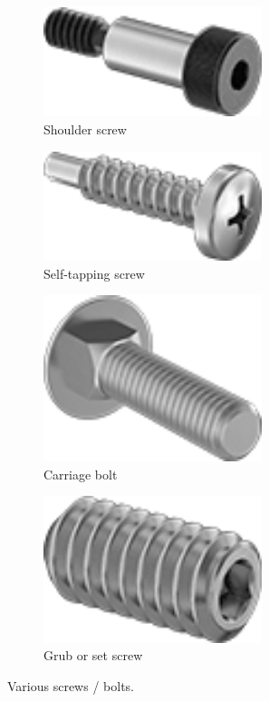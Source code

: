 \documentclass[10pt,letterpaper]{book}
\begin{document}
\begin{figure}[H]
		\begin{subfigure}[b]{.24\linewidth}
			\includegraphics[width=0.7\textwidth]{imgs/shoulderscrew.png}
			\caption{Shoulder screw}
		\end{subfigure}\begin{subfigure}[b]{.24\linewidth}
			\includegraphics[width=0.7\textwidth]{imgs/stscrew.png}
			\caption{Self-tapping screw}
		\end{subfigure}\begin{subfigure}[b]{.24\linewidth}
			\includegraphics[width=0.7\textwidth]{imgs/carriagebolt.png}
			\caption{Carriage bolt}
		\end{subfigure}\begin{subfigure}[b]{.24\linewidth}
			\includegraphics[width=0.7\textwidth]{imgs/grubscrew.png}
			\caption{Grub or set screw}
		\end{subfigure}
		\caption{Various screws / bolts.}
	\end{figure}
	
\end{document}
